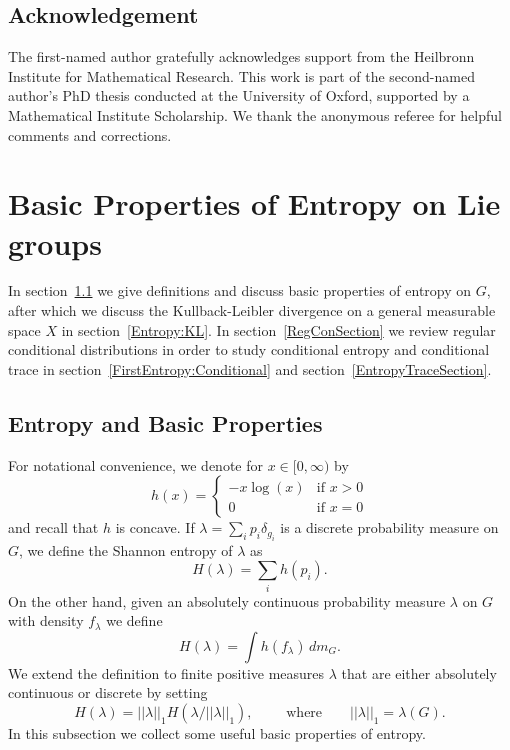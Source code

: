 \documentclass[10pt, english,oneside,reqno]{amsart}
\theoremstyle{plain}
\theoremstyle{remark}
\numberwithin{equation}{section}
\numberwithin{figure}{section}
\newcommand{\Haarof}[1]{m_{#1}}
\begin{document}
    


    
    
    \subsection*{Acknowledgement} The first-named author gratefully acknowledges support from the Heilbronn Institute for Mathematical Research. This work is part of the second-named author's PhD thesis conducted at the University of Oxford, supported by a Mathematical Institute Scholarship. We thank the anonymous referee for helpful comments and corrections.

    


    \section{Basic Properties of Entropy on Lie groups} \label{EntropySection}









In section~\ref{Entropy:Basic} we give definitions and discuss basic properties of entropy on $G$, after which we discuss the Kullback-Leibler divergence on a general measurable space $X$ in section~\ref{Entropy:KL}. In section~\ref{RegConSection} we review regular conditional distributions in order to study conditional entropy and conditional trace in section~\ref{FirstEntropy:Conditional} and section~\ref{EntropyTraceSection}.



\subsection{Entropy and Basic Properties}\label{Entropy:Basic}

For notational convenience, we denote for $x \in [0,\infty)$ by $$h(x) = \begin{cases}  -x\log(x) &\text{if } x > 0 \\ 0 & \text{if } x =0\end{cases}$$ and recall that $h$ is concave. If $\lambda = \sum_{i} p_i \delta_{g_i}$ is a discrete probability measure on $G$, we define the Shannon entropy of $\lambda$ as $$H(\lambda) = \sum_{i} h(p_i).$$ On the other hand, given an absolutely continuous probability measure $\lambda$ on $G$ with density $f_{\lambda}$  we define 
$$H(\lambda) =  \int h(f_{\lambda})  \, d\Haarof{G}.$$ We extend the definition to finite positive measures $\lambda$ that are either absolutely continuous or discrete by setting $$H(\lambda) = ||\lambda||_1 H(\lambda/||\lambda||_1), \quad \quad \text{ where} \quad \quad ||\lambda||_1 = \lambda(G).$$ In this subsection we collect some useful basic properties of entropy. 
\end{document}

